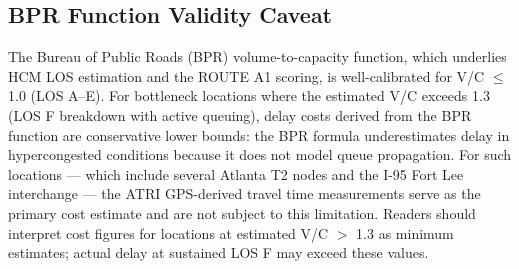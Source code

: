 \subsection{BPR Function Validity Caveat}

The Bureau of Public Roads (BPR) volume-to-capacity function, which underlies HCM LOS estimation and the ROUTE A1 scoring, is well-calibrated for V/C $\leq$ 1.0 (LOS A--E). For bottleneck locations where the estimated V/C exceeds 1.3 (LOS F breakdown with active queuing), delay costs derived from the BPR function are conservative lower bounds: the BPR formula underestimates delay in hypercongested conditions because it does not model queue propagation. For such locations --- which include several Atlanta T2 nodes and the I-95 Fort Lee interchange --- the ATRI GPS-derived travel time measurements serve as the primary cost estimate and are not subject to this limitation. Readers should interpret cost figures for locations at estimated V/C $>$ 1.3 as minimum estimates; actual delay at sustained LOS F may exceed these values.
